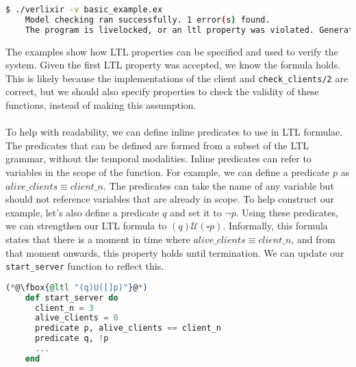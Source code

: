 \begin{lstlisting}[language=bash, xleftmargin=.1\linewidth]
    $ ./verlixir -v basic_example.ex
    Model checking ran successfully. 1 error(s) found.
    The program is livelocked, or an ltl property was violated. Generating trace.
\end{lstlisting}
The examples show how LTL properties can be specified and used to verify the system. Given the first LTL property was accepted, we know the formula holds. This is likely because the implementations of the client and \texttt{check\_clients/2} are correct, but we should also specify properties to check the validity of these functions, instead of making this assumption.
\\ \\
To help with readability, we can define inline predicates to use in LTL formulae. The predicates that can be defined are formed from a subset of the LTL grammar, without the temporal modalities. Inline predicates can refer to variables in the scope of the function. For example, we can define a predicate \( p \) as $alive\_clients \equiv client\_n$. The predicates can take the name of any variable but should not reference variables that are already in scope. To help construct our example, let's also define a predicate \( q \) and set it to \( \neg p \). Using these predicates, we can strengthen our LTL formula to \( (q) \mathcal{U} (\square p) \). Informally, this formula states that there is a moment in time where $alive\_clients \equiv client\_n$, and from that moment onwards, this property holds until termination. We can update our \texttt{start\_server} function to reflect this.
\begin{lstlisting}[language=Elixir, xleftmargin=.3\linewidth]
    (*@\fbox{@ltl "(q)U([]p)"}@*)
    def start_server do
      client_n = 3
      alive_clients = 0
      predicate p, alive_clients == client_n
      predicate q, !p
      ...
    end
\end{lstlisting}
